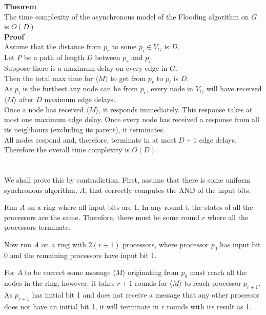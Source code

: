 \documentclass[11pt]{article}
\begin{document}
\textbf{Theorem}\\
The time complexity of the asynchronous model of the Flooding algorithm on $G$ is $O(D)$\\

\textbf{Proof}\\
Assume that the distance from $p_r$ to some $p_i \in V_G$ is $D$.\\
Let $P$ be a path of length $D$ between $p_r$ and $p_i$.\\
Suppose there is a maximum delay on every edge in $G$.\\
Then the total max time for $\langle M \rangle$ to get from $p_r$ to $p_i$ is $D$.\\
As $p_i$ is the furthest any node can be from $p_r$, every node in $V_G$ will have received $\langle M \rangle$ after $D$ maximum edge delays. \\
Once a node has received $\langle M \rangle$, it responds immediately. This response takes at most one maximum edge delay. Once every node has received a response from all its neighbours (excluding its parent), it terminates.\\
All nodes respond and, therefore, terminate in at most $D+1$ edge delays.\\
Therefore the overall time complexity is $O(D)$.

\newpage

\section{}

\subsection{}

We shall prove this by contradiction.
First, assume that there is some uniform synchronous algorithm, $A$, that correctly computes the AND of the input bits. 

Run $A$ on a ring where all input bits are 1. In any round $i$, the states of all the processors are the same. Therefore, there must be some round $r$ where all the processors terminate.

Now run $A$ on a ring with $2(r+1)$ processors, where processor $p_0$ has input bit 0 and the remaining processors have input bit 1. 

For $A$ to be correct some message $\langle M \rangle$ originating from $p_0$ must reach all the nodes in the ring, however, it takes $r+1$ rounds for $\langle M \rangle$ to reach processor $p_{r+1}$. As $p_{r+1}$ has initial bit 1 and does not receive a message that any other processor does not have an initial bit 1, it will terminate in $r$ rounds with its result as 1. 
\end{document}
